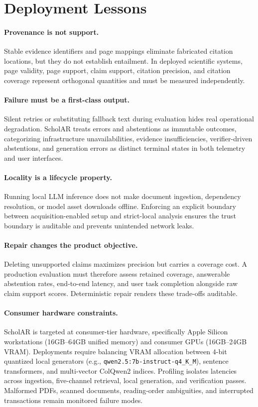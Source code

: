 \section{Deployment Lessons}
\paragraph{Provenance is not support.}
Stable evidence identifiers and page mappings eliminate fabricated citation locations, but they do not establish entailment. In deployed scientific systems, page validity, page support, claim support, citation precision, and citation coverage represent orthogonal quantities and must be measured independently.

\paragraph{Failure must be a first-class output.}
Silent retries or substituting fallback text during evaluation hides real operational degradation. ScholAR treats errors and abstentions as immutable outcomes, categorizing infrastructure unavailabilities, evidence insufficiencies, verifier-driven abstentions, and generation errors as distinct terminal states in both telemetry and user interfaces.

\paragraph{Locality is a lifecycle property.}
Running local LLM inference does not make document ingestion, dependency resolution, or model asset downloads offline. Enforcing an explicit boundary between acquisition-enabled setup and strict-local analysis ensures the trust boundary is auditable and prevents unintended network leaks.

\paragraph{Repair changes the product objective.}
Deleting unsupported claims maximizes precision but carries a coverage cost. A production evaluation must therefore assess retained coverage, answerable abstention rates, end-to-end latency, and user task completion alongside raw claim support scores. Deterministic repair renders these trade-offs auditable.

\paragraph{Consumer hardware constraints.}
ScholAR is targeted at consumer-tier hardware, specifically Apple Silicon workstations (16GB--64GB unified memory) and consumer GPUs (16GB--24GB VRAM). Deployments require balancing VRAM allocation between 4-bit quantized local generators (e.g., \texttt{qwen2.5:7b-instruct-q4\_K\_M}), sentence transformers, and multi-vector ColQwen2 indices. Profiling isolates latencies across ingestion, five-channel retrieval, local generation, and verification passes. Malformed PDFs, scanned documents, reading-order ambiguities, and interrupted transactions remain monitored failure modes.
